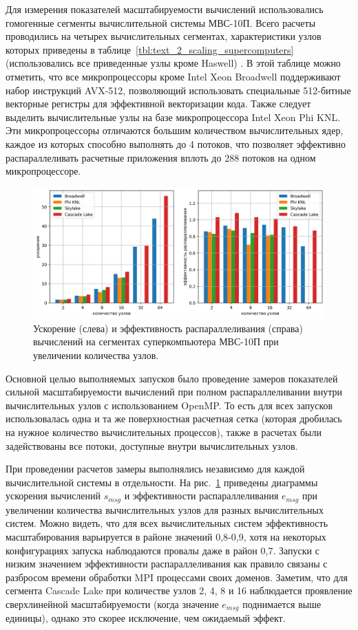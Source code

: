 Для измерения показателей масштабируемости вычислений использовались гомогенные сегменты вычислительной системы МВС-10П.
Всего расчеты проводились на четырех вычислительных сегментах, характеристики узлов которых приведены в таблице~\ref{tbl:text_2_scaling_supercomputers} (использовались все приведенные узлы кроме Haswell) \cite{Shabanov2021Scaling}.
В этой таблице можно отметить, что все микропроцессоры кроме Intel Xeon Broadwell поддерживают набор инструкций AVX-512, позволяющий использовать специальные 512-битные векторные регистры для эффективной векторизации кода.
Также следует выделить вычислительные узлы на базе микропроцессора Intel Xeon Phi KNL.
Эти микропроцессоры отличаются большим количеством вычислительных ядер, каждое из которых способно выполнять до 4 потоков, что позволяет эффективно распараллеливать расчетные приложения вплоть до 288 потоков на одном микропроцессоре.

\begin{figure}[ht]
\centering
\includegraphics[width=1.0\textwidth]{fig/par_surf_2in1.png}
\singlespacing
{}\caption{Ускорение (слева) и эффективность распараллеливания (справа) вычислений на сегментах суперкомпьютера МВС-10П при увеличении количества узлов.}
\label{fig:text_2_scaling_speedup_eff}
\end{figure}

Основной целью выполняемых запусков было проведение замеров показателей сильной масштабируемости вычислений при полном распараллеливании внутри вычислительных узлов с использованием OpenMP.
То есть для всех запусков использовалась одна и та же поверхностная расчетная сетка (которая дробилась на нужное количество вычислительных процессов), также в расчетах были задействованы все потоки, доступные внутри вычислительных узлов.

При проведении расчетов замеры выполнялись независимо для каждой вычислительной системы в отдельности.
На рис.~\ref{fig:text_2_scaling_speedup_eff} приведены диаграммы ускорения вычислений $s_{msg}$ и эффективности распараллеливания $e_{msg}$ при увеличении количества вычислительных узлов для разных вычислительных систем.
Можно видеть, что для всех вычислительных систем эффективность масштабирования варьируется в районе значений 0,8-0,9, хотя на некоторых конфигурациях запуска наблюдаются провалы даже в район 0,7.
Запуски с низким значением эффективности распараллеливания как правило связаны с разбросом времени обработки MPI процессами своих доменов.
Заметим, что для сегмента Cascade Lake при количестве узлов 2, 4, 8 и 16 наблюдается проявление сверхлинейной масштабируемости (когда значение $e_{msg}$ поднимается выше единицы), однако это скорее исключение, чем ожидаемый эффект.

